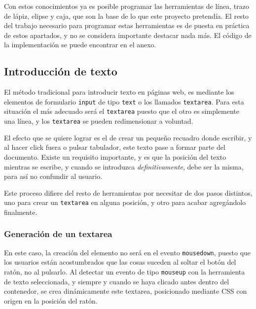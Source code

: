 Con estos conocimientos ya es posible programar las herramientas de línea, trazo de lápiz, elipse y caja, que son la base de lo que este proyecto pretendía. El resto del trabajo necesario para programar estas herramientas es de puesta en práctica de estos apartados, y no se considera importante destacar nada más. El código de la implementación se puede encontrar en el anexo.



\subsection{Introducción de texto} %
\label{sub:introduccion_de_texto}

El método tradicional para introducir texto en páginas web, es mediante los elementos de formulario \texttt{input} de tipo \texttt{text} o los llamados \texttt{textarea}. Para esta situación el más adecuado será el \texttt{textarea} puesto que el otro es simplemente una línea, y los \texttt{textarea} se pueden redimensionar a voluntad.

El efecto que se quiere lograr es el de crear un pequeño recuadro donde escribir, y al hacer click fuera o pulsar tabulador, este texto pase a formar parte del documento. Existe un requisito importante, y es que la posición del texto mientras se escribe, y cuando se introduzca \emph{definitivamente}, debe ser la misma, para así no confundir al usuario.

Este proceso difiere del resto de herramientas por necesitar de dos pasos distintos, uno para crear un \texttt{textarea} en alguna posición, y otro para acabar agregándolo finalmente.

\subsubsection{Generación de un textarea} %
\label{ssub:generacion_de_un_textarea}
En este caso, la creación del elemento no será en el evento \texttt{mousedown}, puesto que los usuarios están acostumbrados que las cosas suceden al soltar el botón del ratón, no al pulsarlo. Al detectar un evento de tipo \texttt{mouseup} con la herramienta de texto seleccionada, y siempre y cuando se haya clicado antes dentro del contenedor, se crea dinámicamente este textarea, posicionado mediante CSS con origen en la posición del ratón.


